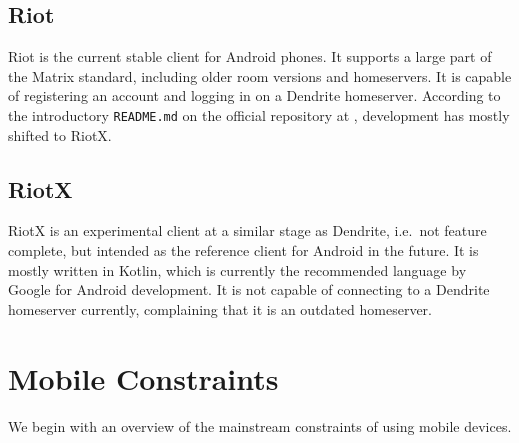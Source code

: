 \subsection{Riot}
Riot is the current stable client for Android phones.
It supports a large part of the Matrix standard, including older room versions and homeservers.
It is capable of registering an account and logging in on a Dendrite homeserver.
According to the introductory \texttt{README.md} on the official repository at , development has mostly shifted to RiotX.

\subsection{RiotX}
RiotX is an experimental client at a similar stage as Dendrite, i.e.~not feature complete, but intended as the reference client for Android in the future.
It is mostly written in Kotlin, which is currently the recommended language by Google for Android development.
It is not capable of connecting to a Dendrite homeserver currently, complaining that it is an outdated homeserver.


\section{Mobile Constraints}\label{sec:mobile_constraints}
We begin with an overview of the mainstream constraints of using mobile devices.

